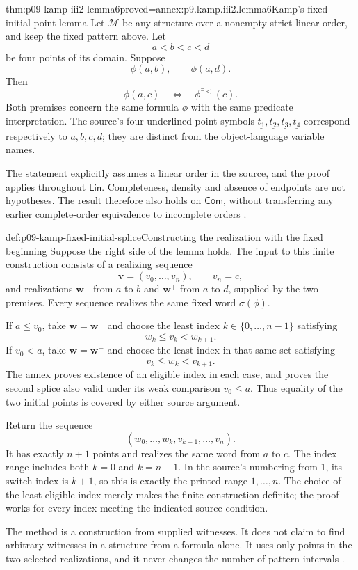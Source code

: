 \begin{hblemma}{thm:p09-kamp-iii2-lemma6}{proved=annex:p9.kamp.iii2.lemma6}{Kamp's fixed-initial-point lemma}
Let \(\mathcal M\) be any structure over a nonempty strict linear
order, and keep the fixed pattern above. Let
\[
                         a<b<c<d
\]
be four points of its domain. Suppose
\[
                         \phi(a,b),\qquad \phi(a,d).
\]
Then
\[
                     \phi(a,c)
                         \quad\Longleftrightarrow\quad
                                  \phi^{\exists<}(c).
\]
Both premises concern the same formula \(\phi\) with the same
predicate interpretation. The source's four underlined point symbols
\(\underline{t_1},\underline{t_2},\underline{t_3},\underline{t_4}\)
correspond respectively to \(a,b,c,d\); they are distinct from the
object-language variable names.

The statement explicitly assumes a linear order in the source, and
the proof applies throughout \(\mathsf{Lin}\). Completeness, density
and absence of endpoints are not hypotheses. The result therefore also
holds on \(\mathsf{Com}\), without transferring any earlier
complete-order equivalence to incomplete orders
\cite[ch.~III, lemma~6, pp.~79--80]{Kamp1968}.
\end{hblemma}

\begin{hbmethod}{def:p09-kamp-fixed-initial-splice}{Constructing the realization with the fixed beginning}
Suppose the right side of the lemma holds. The input to this finite
construction consists of a realizing sequence
\[
                  \mathbf v=(v_0,\ldots,v_n),\qquad v_n=c,
\]
and realizations \(\mathbf w^-\) from \(a\) to \(b\) and
\(\mathbf w^+\) from \(a\) to \(d\), supplied by the two premises.
Every sequence realizes the same fixed word \(\sigma(\phi)\).

If \(a\leq v_0\), take \(\mathbf w=\mathbf w^+\) and choose the
least index \(k\in\{0,\ldots,n-1\}\) satisfying
\[
                         w_k\leq v_k<w_{k+1}.
\]
If \(v_0<a\), take \(\mathbf w=\mathbf w^-\) and choose the
least index in that same set satisfying
\[
                         v_k\leq w_k<v_{k+1}.
\]
The annex proves existence of an eligible index in each case, and
proves the second splice also valid under its weak comparison
\(v_0\leq a\). Thus equality of the two initial points is covered
by either source argument.

Return the sequence
\[
                    (w_0,\ldots,w_k,v_{k+1},\ldots,v_n).
\]
It has exactly \(n+1\) points and realizes the same word from \(a\)
to \(c\). The index range includes both \(k=0\) and \(k=n-1\).
In the source's numbering from 1, its switch index is \(k+1\),
so this is exactly the printed range \(1,\ldots,n\).
The choice of the least eligible index merely makes the finite
construction definite; the proof works for every index meeting the
indicated source condition.

The method is a construction from supplied witnesses. It does not
claim to find arbitrary witnesses in a structure from a formula alone.
It uses only points in the two selected realizations, and it never
changes the number of pattern intervals
\cite[ch.~III, p.~80]{Kamp1968}.
\end{hbmethod}

